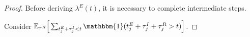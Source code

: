 \documentclass[12pt]{article}
\begin{document}
\begin{proof}
  
  




Before deriving $\lambda^E(t)$, it is necessary to complete intermediate steps. 

Consider $\mathbb{E}_{\tau^R}\Big [ \sum_{t_j^E + \tau_j^I < t} \mathbbm{1} (t_j^E + \tau_j^I + \tau_j^R > t) \Big ]$. 


\end{proof}
\end{document}
